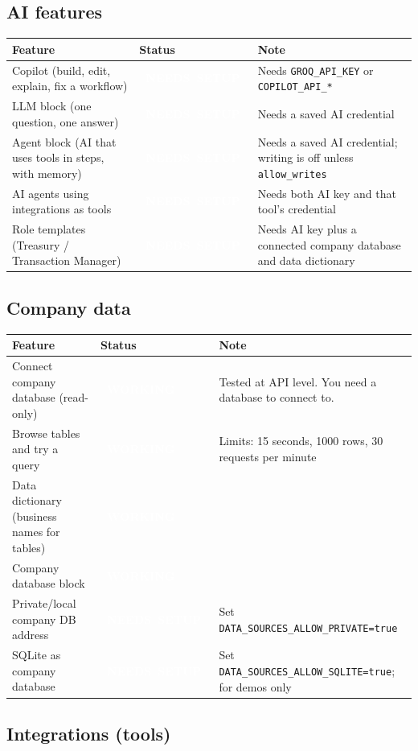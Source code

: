 \documentclass[11pt,a4paper]{article}
\newcommand{\sWork}{\colorbox{okc}{\textcolor{white}{\scriptsize\bfseries\ WORKING\ }}}
\newcommand{\sSetup}{\colorbox{setupc}{\textcolor{white}{\scriptsize\bfseries\ NEEDS\ SETUP\ }}}
\newcommand{\env}[1]{\texttt{#1}}
\begin{document}
\subsection{AI features}

\begin{longtable}{@{}L{4.6cm}L{2.6cm}L{8.4cm}@{}}
\toprule
\textbf{Feature} & \textbf{Status} & \textbf{Note} \\
\midrule
\endhead
Copilot (build, edit, explain, fix a workflow) & \sSetup & Needs \env{GROQ\_API\_KEY} or \env{COPILOT\_API\_*} \\
LLM block (one question, one answer) & \sSetup & Needs a saved AI credential \\
Agent block (AI that uses tools in steps, with memory) & \sSetup & Needs a saved AI credential; writing is off unless \texttt{allow\_writes} \\
AI agents using integrations as tools & \sSetup & Needs both AI key and that tool's credential \\
Role templates (Treasury / Transaction Manager) & \sSetup & Needs AI key plus a connected company database and data dictionary \\
\bottomrule
\end{longtable}

\subsection{Company data}

\begin{longtable}{@{}L{4.6cm}L{2.6cm}L{8.4cm}@{}}
\toprule
\textbf{Feature} & \textbf{Status} & \textbf{Note} \\
\midrule
\endhead
Connect company database (read-only) & \sWork & Tested at API level. You need a database to connect to. \\
Browse tables and try a query & \sWork & Limits: 15 seconds, 1000 rows, 30 requests per minute \\
Data dictionary (business names for tables) & \sWork & \\
Company database block & \sWork & \\
Private/local company DB address & \sSetup & Set \env{DATA\_SOURCES\_ALLOW\_PRIVATE=true} \\
SQLite as company database & \sSetup & Set \env{DATA\_SOURCES\_ALLOW\_SQLITE=true}; for demos only \\
\bottomrule
\end{longtable}

\subsection{Integrations (tools)}
\end{document}
